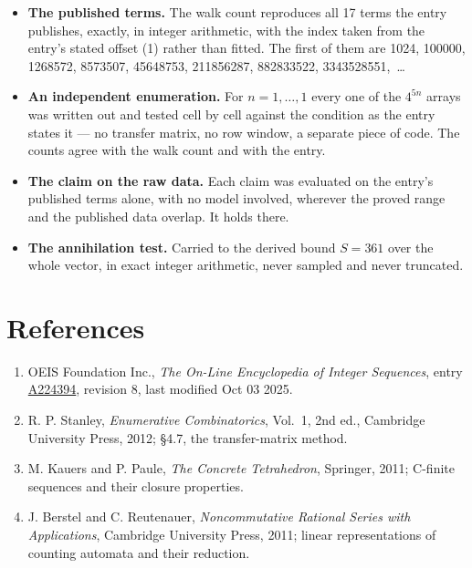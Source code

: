 \documentclass[11pt]{article}
\theoremstyle{definition}
\begin{document}
\begin{itemize}

\item {\bfseries The published terms.} The walk count reproduces all 17 terms the entry publishes, exactly, in integer arithmetic, with the index taken from the entry's stated offset (1) rather than fitted. The first of them are 1024, 100000, 1268572, 8573507, 45648753, 211856287, 882833522, 3343528551,~\dots

\item {\bfseries An independent enumeration.} For $n = 1,\dots,1$ every one of the $4^{5n}$ arrays was written out and tested cell by cell against the condition as the entry states it --- no transfer matrix, no row window, a separate piece of code. The counts agree with the walk count and with the entry.

\item {\bfseries The claim on the raw data.} Each claim was evaluated on the entry's published terms alone, with no model involved, wherever the proved range and the published data overlap. It holds there.

\item {\bfseries The annihilation test.} Carried to the derived bound $S = 361$ over the whole vector, in exact integer arithmetic, never sampled and never truncated.

\end{itemize}

\section{References}

\begin{enumerate}

\item OEIS Foundation Inc., \emph{The On-Line Encyclopedia of Integer Sequences}, entry \href{https://oeis.org/A224394}{A224394}, revision 8, last modified Oct 03 2025.

\item R. P. Stanley, \emph{Enumerative Combinatorics}, Vol.~1, 2nd ed., Cambridge University Press, 2012; \S4.7, the transfer-matrix method.

\item M. Kauers and P. Paule, \emph{The Concrete Tetrahedron}, Springer, 2011; C-finite sequences and their closure properties.

\item J. Berstel and C. Reutenauer, \emph{Noncommutative Rational Series with Applications}, Cambridge University Press, 2011; linear representations of counting automata and their reduction.

\end{enumerate}
\end{document}
